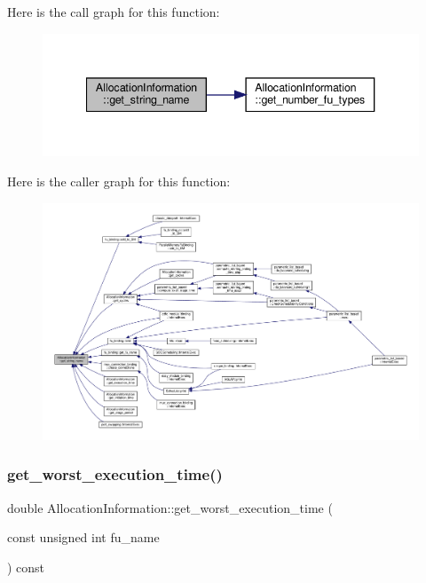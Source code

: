 Here is the call graph for this function\+:
\nopagebreak
\begin{figure}[H]
\begin{center}
\leavevmode
\includegraphics[width=340pt]{d7/d79/classAllocationInformation_a184fc8351b07d9fa39a576bf7dd97133_cgraph}
\end{center}
\end{figure}
Here is the caller graph for this function\+:
\nopagebreak
\begin{figure}[H]
\begin{center}
\leavevmode
\includegraphics[width=350pt]{d7/d79/classAllocationInformation_a184fc8351b07d9fa39a576bf7dd97133_icgraph}
\end{center}
\end{figure}
\mbox{\label{classAllocationInformation_ac059b480028b8c93e67313eb73b52c88}} 
\subsubsection{\texorpdfstring{get\+\_\+worst\+\_\+execution\+\_\+time()}{get\_worst\_execution\_time()}}
{\footnotesize\ttfamily double Allocation\+Information\+::get\+\_\+worst\+\_\+execution\+\_\+time (\begin{DoxyParamCaption}\item[{const unsigned int}]{fu\+\_\+name }\end{DoxyParamCaption}) const}



